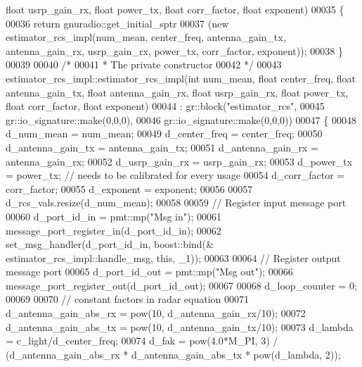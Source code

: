 \begin{DoxyCode}
{      float} usrp\_gain\_rx, \textcolor{keywordtype}{float} power\_tx, \textcolor{keywordtype}{float} corr\_factor, \textcolor{keywordtype}{float} exponent)
00035     \{
00036       \textcolor{keywordflow}{return} gnuradio::get\_initial\_sptr
00037         (\textcolor{keyword}{new} estimator_rcs_impl(num\_mean, center\_freq, antenna\_gain\_tx, antenna\_gain\_rx, usrp\_gain\_rx, 
      power\_tx, corr\_factor, exponent));
00038     \}
00039 
00040     \textcolor{comment}{/*}
00041 \textcolor{comment}{     * The private constructor}
00042 \textcolor{comment}{     */}
00043     estimator_rcs_impl::estimator_rcs_impl(\textcolor{keywordtype}{int} num\_mean, \textcolor{keywordtype}{float} center_freq, \textcolor{keywordtype}{float} antenna\_gain\_tx, \textcolor{keywordtype}{float} 
      antenna\_gain\_rx, \textcolor{keywordtype}{float} usrp\_gain\_rx, \textcolor{keywordtype}{float} power\_tx, \textcolor{keywordtype}{float} corr\_factor, \textcolor{keywordtype}{float} exponent)
00044       : gr::block(\textcolor{stringliteral}{"estimator\_rcs"},
00045               gr::io\_signature::make(0,0,0),
00046               gr::io\_signature::make(0,0,0))
00047     \{
00048         d_num_mean = num\_mean;
00049         d_center_freq = center_freq;
00050         d_antenna_gain_tx = antenna\_gain\_tx;
00051         d_antenna_gain_rx = antenna\_gain\_rx;
00052         d_usrp_gain_rx = usrp\_gain\_rx;
00053         d_power_tx = power\_tx; \textcolor{comment}{// needs to be calibrated for every usage}
00054         d_corr_factor = corr\_factor;
00055         d_exponent = exponent;
00056 
00057         d_rcs_vals.resize(d_num_mean);
00058 
00059         \textcolor{comment}{// Register input message port}
00060         d_port_id_in = pmt::mp(\textcolor{stringliteral}{"Msg in"});
00061         message\_port\_register\_in(d_port_id_in);
00062         set\_msg\_handler(d_port_id_in, boost::bind(&
      estimator_rcs_impl::handle_msg, \textcolor{keyword}{this}, \_1));
00063         
00064         \textcolor{comment}{// Register output message port}
00065         d_port_id_out = pmt::mp(\textcolor{stringliteral}{"Msg out"});
00066         message\_port\_register\_out(d_port_id_out);
00067 
00068         d_loop_counter = 0;
00069 
00070         \textcolor{comment}{// constant factors in radar equation}
00071         d_antenna_gain_abs_rx = pow(10, d_antenna_gain_rx/10);
00072         d_antenna_gain_abs_tx = pow(10, d_antenna_gain_tx/10);
00073         d_lambda = c_light/d_center_freq;
00074         d_fak = pow(4.0*M\_PI, 3) / (d_antenna_gain_abs_rx * 
      d_antenna_gain_abs_tx * pow(d_lambda, 2));

\end{DoxyCode}
